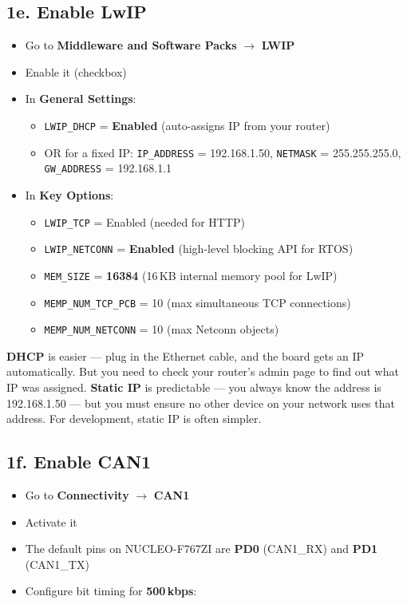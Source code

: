 \documentclass[11pt,a4paper]{article}
\begin{document}
\newpage

\subsection{1e. Enable LwIP}
\begin{itemize}[leftmargin=2em]
  \item Go to \textbf{Middleware and Software Packs} $\rightarrow$ \textbf{LWIP}
  \item Enable it (checkbox)
  \item In \textbf{General Settings}:
  \begin{itemize}
    \item \texttt{LWIP\_DHCP} = \textbf{Enabled} (auto-assigns IP from your router)
    \item OR for a fixed IP: \texttt{IP\_ADDRESS} = 192.168.1.50, \texttt{NETMASK} = 255.255.255.0, \texttt{GW\_ADDRESS} = 192.168.1.1
  \end{itemize}
  \item In \textbf{Key Options}:
  \begin{itemize}
    \item \texttt{LWIP\_TCP} = Enabled (needed for HTTP)
    \item \texttt{LWIP\_NETCONN} = \textbf{Enabled} (high-level blocking API for RTOS)
    \item \texttt{MEM\_SIZE} = \textbf{16384} (16\,KB internal memory pool for LwIP)
    \item \texttt{MEMP\_NUM\_TCP\_PCB} = 10 (max simultaneous TCP connections)
    \item \texttt{MEMP\_NUM\_NETCONN} = 10 (max Netconn objects)
  \end{itemize}
\end{itemize}

\begin{infobox}
\textbf{DHCP} is easier --- plug in the Ethernet cable, and the board gets an IP automatically. But you need to check your router's admin page to find out what IP was assigned. \textbf{Static IP} is predictable --- you always know the address is 192.168.1.50 --- but you must ensure no other device on your network uses that address. For development, static IP is often simpler.
\end{infobox}

\subsection{1f. Enable CAN1}
\begin{itemize}[leftmargin=2em]
  \item Go to \textbf{Connectivity} $\rightarrow$ \textbf{CAN1}
  \item Activate it
  \item The default pins on NUCLEO-F767ZI are \textbf{PD0} (CAN1\_RX) and \textbf{PD1} (CAN1\_TX)
  \item Configure bit timing for \textbf{500\,kbps}:
\end{itemize}
\end{document}
